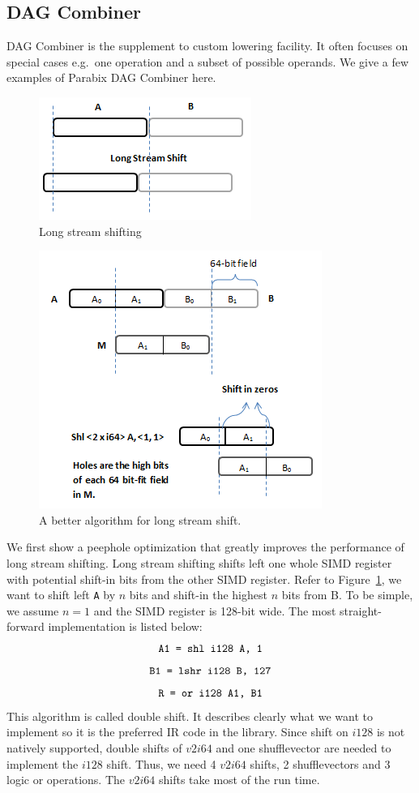 \subsection{DAG Combiner}
\label{sec:long_shift}
DAG Combiner is the supplement to custom lowering facility. It often focuses on special cases e.g.\ one operation and a subset of possible operands. We give a few examples of Parabix DAG Combiner here.

\begin{figure}[htbp!]
\centering
\includegraphics[scale=0.8]{draw/long_shift.png}
\caption{Long stream shifting}
\label{fig:long_shift}
\end{figure}

\begin{figure}[htbp!]
\centering
\includegraphics[scale=0.9]{draw/long_shift_good.png}
\caption{A better algorithm for long stream shift.}
\label{fig:long_shift_good}
\end{figure}

We first show a peephole optimization that greatly improves the performance of long stream shifting. Long stream shifting shifts left one whole SIMD register with potential shift-in bits from the other SIMD register. Refer to Figure~\ref{fig:long_shift}, we want to shift left {\tt A} by $n$ bits and shift-in the highest $n$ bits from B. To be simple, we assume $n = 1$ and the SIMD register is 128-bit wide. The most straight-forward implementation is listed below:
  \[ \text{\tt A1 = shl i128 A, 1} \]
  \[ \text{\tt B1 = lshr i128 B, 127} \]
  \[ \text{\tt R = or i128 A1, B1} \]
This algorithm is called double shift. It describes clearly what we want to implement so it is the preferred IR code in the library. Since shift on $i128$ is not natively supported, double shifts of $v2i64$ and one shufflevector are needed to implement the $i128$ shift. Thus, we need 4 $v2i64$ shifts, 2 shufflevectors and 3 logic or operations. The $v2i64$ shifts take most of the run time.

